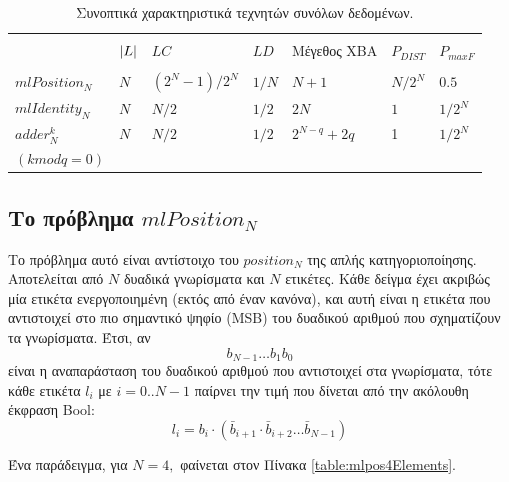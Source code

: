 \begin{table}
\begin{center}
\caption{Συνοπτικά χαρακτηριστικά τεχνητών συνόλων δεδομένων.}
\label{table:artificialDatasetsChar}
    \begin{tabular}{lllllll}
    \hline \\ [-2ex]
    ~                & $\lvert L\rvert$ & $LC$  & $LD$  & Μέγεθος ΧΒΑ & $P_{DIST}$ & $P_{maxF}$ \\
    \hline
    \hline \\ [-2ex]
    $mlPosition_{N}$ & $N$     & $(2^{N}-1) / 2^{N}$   & $1/N$ & $N+1$                   & $N/2^{N}$  & $0.5$      \\
    $mlIdentity_{N}$ & $N$     & $N/2$ & $1/2$ & $2N$                    & $1$        & $1/2^{N}$  \\
    $adder^{k}_{N}$  & $N$     & $N/2$ & $1/2$ & $2^{N-q} + 2q$          & 1          & $1/2^{N}$  \\
    $(kmodq=0)$      & ~       & ~     & ~     & ~                       & ~          & ~          \\
    \hline
    \end{tabular}
    \end{center}
\end{table}

\subsection{Το πρόβλημα $mlPosition_{N}$}
Το πρόβλημα αυτό είναι αντίστοιχο του $position_{N}$ της απλής κατηγοριοποίησης. Αποτελείται από $N$ δυαδικά γνωρίσματα και $N$ ετικέτες. Κάθε δείγμα έχει ακριβώς μία ετικέτα ενεργοποιημένη (εκτός από έναν κανόνα), και αυτή είναι η ετικέτα που αντιστοιχεί στο πιο σημαντικό ψηφίο (MSB) του δυαδικού αριθμού που σχηματίζουν τα γνωρίσματα. Έτσι, αν $$ b_{N-1}\dots b_{1}b_{0}$$ είναι η αναπαράσταση του δυαδικού αριθμού που αντιστοιχεί στα γνωρίσματα, τότε κάθε ετικέτα $l_{i}$ με $i=0..N-1$ παίρνει την τιμή που δίνεται από την ακόλουθη έκφραση Bool: $$l_{i} = b_{i} \cdot (\bar{b}_{i+1} \cdot \bar{b}_{i+2}\dots\bar{b}_{N-1})$$
 
Ένα παράδειγμα, για $N=4,$ φαίνεται στον Πίνακα \ref{table:mlpos4Elements}.

